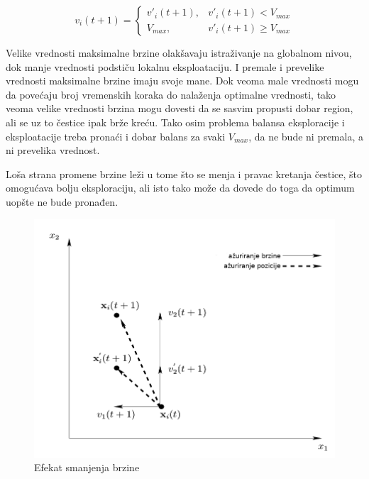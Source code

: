 \documentclass[a4paper]{article}
\begin{document}
\begin{equation}
    v_i(t+1) = \begin{cases}
                
            v'_i(t+1),  &  v'_i(t+1) < V_{max}\\
            V_{max},  &   v'_i(t+1) \geq V_{max}
           
             \end{cases}
\end{equation}

Velike vrednosti maksimalne brzine olakšavaju istraživanje na globalnom nivou, dok manje vrednosti podstiču lokalnu eksploataciju. I premale i prevelike vrednosti maksimalne brzine imaju svoje mane. Dok veoma male vrednosti mogu da povećaju broj vremenskih koraka do nalaženja optimalne vrednosti, tako veoma velike vrednosti brzina mogu dovesti da se sasvim propusti dobar region, ali se uz to čestice ipak brže kreću. 
Tako osim problema balansa eksploracije i eksploatacije treba pronaći i dobar balans za svaki $V_{max}$, da ne bude ni premala, a ni prevelika vrednost.

Loša strana promene brzine leži u tome što se menja i pravac kretanja čestice, što omogućava bolju eksploraciju, ali isto tako može da dovede do toga da optimum uopšte ne bude pronađen.

\begin{figure}[htp]
    \centering
    \includegraphics[scale=0.3]{slika3_1.png}
    \caption{Efekat smanjenja brzine}
    \label{fig:smanjenje_brzina}
\end{figure}
\end{document}
